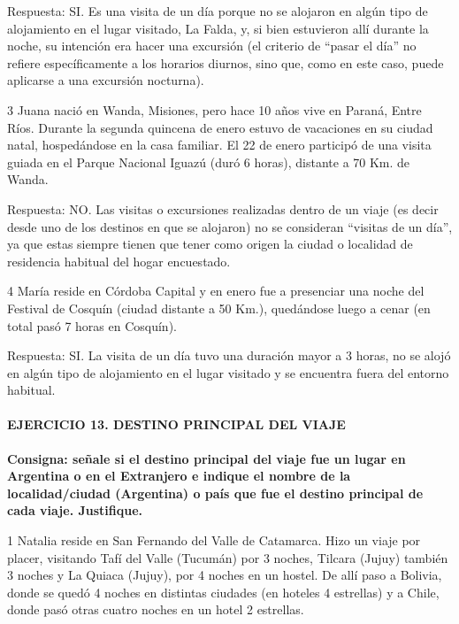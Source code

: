 \documentclass[
  openany]{book}
\begin{document}
Respuesta: SI. Es una visita de un día porque no se alojaron en algún tipo de alojamiento en el lugar visitado, La Falda, y, si bien estuvieron allí durante la noche, su intención era hacer una excursión (el criterio de ``pasar el día'' no refiere específicamente a los horarios diurnos, sino que, como en este caso, puede aplicarse a una excursión nocturna).

3 Juana nació en Wanda, Misiones, pero hace 10 años vive en Paraná, Entre Ríos. Durante la segunda quincena de enero estuvo de vacaciones en su ciudad natal, hospedándose en la casa familiar. El 22 de enero participó de una visita guiada en el Parque Nacional Iguazú (duró 6 horas), distante a 70 Km. de Wanda.

Respuesta: NO. Las visitas o excursiones realizadas dentro de un viaje (es decir desde uno de los destinos en que se alojaron) no se consideran ``visitas de un día'', ya que estas siempre tienen que tener como origen la ciudad o localidad de residencia habitual del hogar encuestado.

4 María reside en Córdoba Capital y en enero fue a presenciar una noche del Festival de Cosquín (ciudad distante a 50 Km.), quedándose luego a cenar (en total pasó 7 horas en Cosquín).

Respuesta: SI. La visita de un día tuvo una duración mayor a 3 horas, no se alojó en algún tipo de alojamiento en el lugar visitado y se encuentra fuera del entorno habitual.

\hypertarget{ejercicio-13.-destino-principal-del-viaje-1}{%
\paragraph{\texorpdfstring{\textbf{EJERCICIO 13. DESTINO PRINCIPAL DEL VIAJE}}{EJERCICIO 13. DESTINO PRINCIPAL DEL VIAJE}}\label{ejercicio-13.-destino-principal-del-viaje-1}}

\textbf{Consigna: señale si el destino principal del viaje fue un lugar en Argentina o en el Extranjero e indique el nombre de la localidad/ciudad (Argentina) o país que fue el destino principal de cada viaje. Justifique.}

1 Natalia reside en San Fernando del Valle de Catamarca. Hizo un viaje por placer, visitando Tafí del Valle (Tucumán) por 3 noches, Tilcara (Jujuy) también 3 noches y La Quiaca (Jujuy), por 4 noches en un hostel. De allí paso a Bolivia, donde se quedó 4 noches en distintas ciudades (en hoteles 4 estrellas) y a Chile, donde pasó otras cuatro noches en un hotel 2 estrellas.
\end{document}
